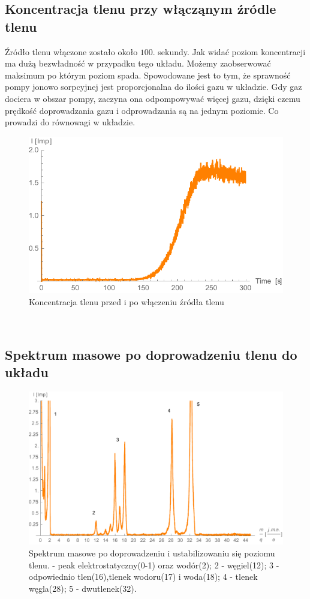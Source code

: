\documentclass[paper=a4, fontsize=12pt]{scrartcl}
\begin{document}
\subsection{Koncentracja tlenu przy włącząnym źródle tlenu}
Źródło tlenu włączone zostało około $100$. sekundy. Jak widać poziom koncentracji ma dużą bezwładność w przypadku tego układu. Możemy zaobserwować maksimum po którym poziom spada. Spowodowane jest to tym, że sprawność pompy jonowo sorpcyjnej jest proporcjonalna do ilości gazu w układzie. Gdy gaz dociera w obszar pompy, zaczyna ona odpompowywać więcej gazu, dzięki czemu prędkość doprowadzania gazu i odprowadzania są na jednym poziomie. Co prowadzi do równowagi w układzie.
\begin{figure}[h!]
\centering
\includegraphics[width=0.6\linewidth]{32time}
\caption{Koncentracja tlenu przed i po włączeniu źródła tlenu}
\label{fig:32time}
\end{figure}\\


\subsection{Spektrum masowe po doprowadzeniu tlenu do układu}
\begin{figure}[h!]
\centering
\includegraphics[width=0.7\linewidth]{spektlen}
\caption{Spektrum masowe po doprowadzeniu i ustabilizowaniu się poziomu tlenu. - peak elektrostatyczny(0-1) oraz wodór(2); 2 - węgiel(12); 3 - odpowiednio tlen(16),\newline tlenek wodoru(17) i woda(18); 4 - tlenek węgla(28); 5 - dwutlenek(32).}
\label{fig:spektlen}
\end{figure}
\end{document}
